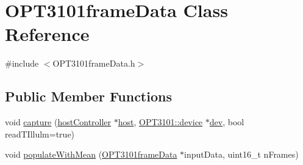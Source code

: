 \hypertarget{class_o_p_t3101frame_data}{}\section{O\+P\+T3101frame\+Data Class Reference}
\label{class_o_p_t3101frame_data}


{\ttfamily \#include $<$O\+P\+T3101frame\+Data.\+h$>$}

\subsection*{Public Member Functions}
\begin{DoxyCompactItemize}
\item 
void \mbox{\hyperlink{class_o_p_t3101frame_data_afe171f6c03686ece1a865029090e1df3}{capture}} (\mbox{\hyperlink{classhost_controller}{host\+Controller}} $\ast$\mbox{\hyperlink{register_8h_a47f8cbf152e48aa4fdb624be57a9a856}{host}}, \mbox{\hyperlink{class_o_p_t3101_1_1device}{O\+P\+T3101\+::device}} $\ast$\mbox{\hyperlink{main_8cpp_ae89da95486821d0a26b9592cd8891276}{dev}}, bool read\+T\+Illulm=true)
\item 
void \mbox{\hyperlink{class_o_p_t3101frame_data_aaa94f04c355522bc236dc83bac043a1c}{populate\+With\+Mean}} (\mbox{\hyperlink{class_o_p_t3101frame_data}{O\+P\+T3101frame\+Data}} $\ast$input\+Data, uint16\+\_\+t n\+Frames)
\end{DoxyCompactItemize}

